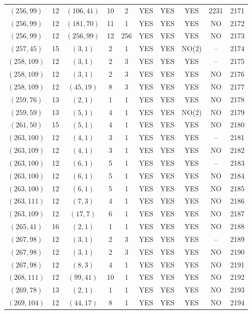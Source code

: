 \begin{longtable}{|c|c|c|c|c|c|c|c|c|c|}
$(256, 99)$ & 12 & $(106, 41)$ & 10 & 2 & YES & YES & YES & 2231 & 2171\\
$(256, 99)$ & 12 & $(181, 70)$ & 11 & 1 & YES & YES & YES & NO & 2172\\
$(256, 99)$ & 12 & $(256, 99)$ & 12 & 256 & YES & YES & YES & NO & 2173\\
$(257, 45)$ & 15 & $(3, 1)$ & 2 & 1 & YES & YES & NO(2) & -- & 2174\\
$(258, 109)$ & 12 & $(3, 1)$ & 2 & 3 & YES & YES & YES & -- & 2175\\
$(258, 109)$ & 12 & $(3, 1)$ & 2 & 3 & YES & YES & YES & NO & 2176\\
$(258, 109)$ & 12 & $(45, 19)$ & 8 & 3 & YES & YES & YES & NO & 2177\\
$(259, 76)$ & 13 & $(2, 1)$ & 1 & 1 & YES & YES & YES & NO & 2178\\
$(259, 59)$ & 13 & $(5, 1)$ & 4 & 1 & YES & YES & NO(2) & NO & 2179\\
$(261, 50)$ & 15 & $(5, 1)$ & 4 & 1 & YES & YES & YES & NO & 2180\\
$(263, 100)$ & 12 & $(4, 1)$ & 3 & 1 & YES & YES & YES & -- & 2181\\
$(263, 109)$ & 12 & $(4, 1)$ & 3 & 1 & YES & YES & YES & NO & 2182\\
$(263, 100)$ & 12 & $(6, 1)$ & 5 & 1 & YES & YES & YES & -- & 2183\\
$(263, 100)$ & 12 & $(6, 1)$ & 5 & 1 & YES & YES & YES & NO & 2184\\
$(263, 100)$ & 12 & $(6, 1)$ & 5 & 1 & YES & YES & YES & NO & 2185\\
$(263, 111)$ & 12 & $(7, 3)$ & 4 & 1 & YES & YES & YES & NO & 2186\\
$(263, 109)$ & 12 & $(17, 7)$ & 6 & 1 & YES & YES & YES & NO & 2187\\
$(265, 41)$ & 16 & $(2, 1)$ & 1 & 1 & YES & YES & YES & NO & 2188\\
$(267, 98)$ & 12 & $(3, 1)$ & 2 & 3 & YES & YES & YES & -- & 2189\\
$(267, 98)$ & 12 & $(3, 1)$ & 2 & 3 & YES & YES & YES & NO & 2190\\
$(267, 98)$ & 12 & $(8, 3)$ & 4 & 1 & YES & YES & YES & NO & 2191\\
$(268, 111)$ & 12 & $(99, 41)$ & 10 & 1 & YES & YES & YES & NO & 2192\\
$(269, 78)$ & 13 & $(2, 1)$ & 1 & 1 & YES & YES & YES & NO & 2193\\
$(269, 104)$ & 12 & $(44, 17)$ & 8 & 1 & YES & YES & YES & NO & 2194\\

\end{longtable}
